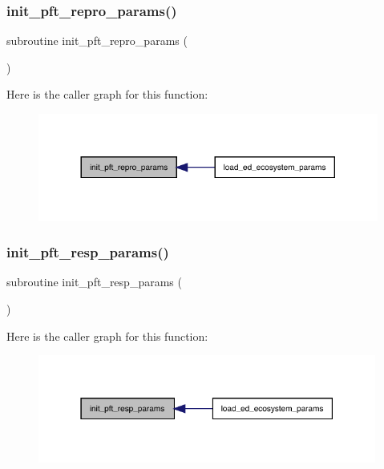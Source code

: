 \subsubsection{\texorpdfstring{init\+\_\+pft\+\_\+repro\+\_\+params()}{init\_pft\_repro\_params()}}
{\footnotesize\ttfamily subroutine init\+\_\+pft\+\_\+repro\+\_\+params (\begin{DoxyParamCaption}{ }\end{DoxyParamCaption})}

Here is the caller graph for this function\+:
\nopagebreak
\begin{figure}[H]
\begin{center}
\leavevmode
\includegraphics[width=317pt]{ed__params_8f90_af887dfc134ede40b3777de2e5d21e053_icgraph}
\end{center}
\end{figure}
\mbox{\label{ed__params_8f90_a0263c036bee68fc0194b052a04e5316e}} 
\subsubsection{\texorpdfstring{init\+\_\+pft\+\_\+resp\+\_\+params()}{init\_pft\_resp\_params()}}
{\footnotesize\ttfamily subroutine init\+\_\+pft\+\_\+resp\+\_\+params (\begin{DoxyParamCaption}{ }\end{DoxyParamCaption})}

Here is the caller graph for this function\+:
\nopagebreak
\begin{figure}[H]
\begin{center}
\leavevmode
\includegraphics[width=315pt]{ed__params_8f90_a0263c036bee68fc0194b052a04e5316e_icgraph}
\end{center}
\end{figure}
\mbox{\label{ed__params_8f90_a042d48afe0e36c29a7065500b43004b6}} 
